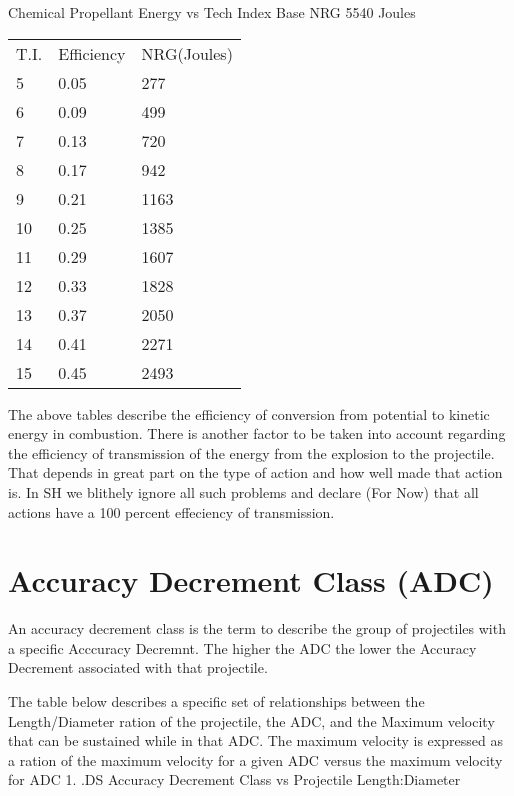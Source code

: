 Chemical Propellant Energy vs Tech Index
Base NRG     5540 Joules

\begin{tabular}{||l|l|l||}
T.I.        & Efficiency      & NRG(Joules) \\
5      		& 0.05            &   277 \\
6      		& 0.09            &   499 \\
7      		& 0.13            &   720 \\
8      		& 0.17            &   942 \\
9      		& 0.21           &   1163 \\
10     		& 0.25           &   1385 \\
11     		& 0.29           &   1607 \\
12     		& 0.33           &   1828 \\
13     		& 0.37           &   2050 \\
14     		& 0.41           &   2271 \\
15     		& 0.45           &   2493 \\
\end{tabular}

The above tables describe the efficiency of conversion from 
potential to kinetic energy in combustion. There is another factor to 
be taken into account regarding the efficiency of transmission of the 
energy from the explosion to the projectile. That depends in great 
part on the type of action and how well made that action is. In SH we 
blithely ignore all such problems and declare (For Now) that all 
actions have a 100 percent effeciency of transmission.

\section{Accuracy Decrement Class (ADC)}

An accuracy decrement class is the term to describe the group of 
projectiles with a specific Acccuracy Decremnt. The higher the ADC the 
lower the Accuracy Decrement associated with that projectile. 

The table below describes a specific set of relationships between 
the Length/Diameter ration of the projectile, the ADC, and the 
Maximum velocity that can be sustained while in that ADC. The maximum 
velocity is expressed as a ration of the maximum velocity for a given 
ADC versus the maximum velocity for ADC 1. 
.DS
Accuracy Decrement Class vs Projectile Length:Diameter


